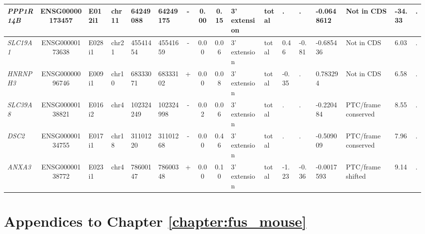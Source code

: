 \begin{appendices}
\begin{landscape}
\begin{table}
{\begin{tabular}{|l|c|l|l|l|l|c|c|c|l|l|l|l|l|l|l|l|}
		\textit{PPP1R14B} & ENSG00000173457 & E012i1 & chr11 & 64249088 & 64249175 & -     & 0.00  & 0.15  & 3' extension & total & . & . & -0.0648612 & Not in CDS     & -34.33 & . \\ \hline
		\textit{SLC19A1} & ENSG00000173638 & E028i1 & chr21 & 45541454 & 45541659 & -     & 0.00  & 0.06  & 3' extension & total & 0.46  & -0.81 & -0.685436 & Not in CDS     & 6.03  & . \\ \hline
		\textit{HNRNPH3} & ENSG00000096746 & E009i1 & chr10 & 68333071 & 68333102 & +     & 0.00  & 0.08  & 3' extension & total & -0.35 & . & 0.783294 & Not in CDS     & 6.58  & . \\ \hline
		\textit{SLC39A8} & ENSG00000138821 & E016i2 & chr4  & 102324249 & 102324998 & -     & 0.02  & 0.06  & 3' extension & total & . & . & -0.220484 & PTC/frame conserved & 8.55  & . \\ \hline
		\textit{DSC2} & ENSG00000134755 & E017i1 & chr18 & 31101220 & 31101268 & -     & 0.00  & 0.46  & 3' extension & total & . & . & -0.509009 & PTC/frame conserved & 7.96  & . \\ \hline
		\textit{ANXA3} & ENSG00000138772 & E023i1 & chr4  & 78600147 & 78600348 & +     & 0.00  & 0.10  & 3' extension & total & -1.23 & -0.36 & -0.0017593 & PTC/frame shifted & 9.14  & . \\ \hline
	\end{tabular}%
	} 
\end{table}%

\end{landscape}

\addtolength{\abovecaptionskip}{25mm}

\clearpage


\section{Appendices to Chapter \autoref{chapter:fus_mouse} }


\end{appendices}
